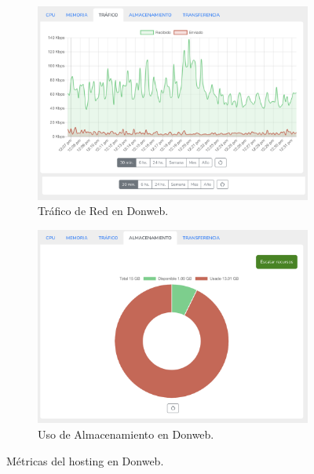 {\begin{figure}[H]
    \begin{subfigure}[b]{0.45\textwidth}
        \centering
        \includegraphics[width=\textwidth]{Figures/PortalWeb/Trafico-Donweb.png}
        \caption{Tráfico de Red en Donweb.}
        \label{fig:trafico-donweb}
    \end{subfigure}
    \hfill
    \begin{subfigure}[b]{0.45\textwidth}
        \centering
        \includegraphics[width=\textwidth]{Figures/PortalWeb/Almacenamiento-Donweb.png}
        \caption{Uso de Almacenamiento en Donweb.}
        \label{fig:almacenamiento-donweb}
    \end{subfigure}
    
    \caption{Métricas del hosting en Donweb.}
    \label{fig:metricas-donweb}
\end{figure}


}
